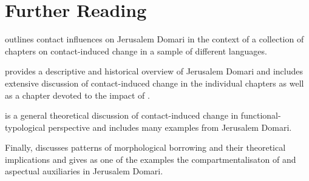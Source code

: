 \documentclass[output=paper]{langsci/langscibook}
\begin{document}
\section*{Further Reading}
\begin{furtherreading}
\item[\citet{Matras2007Domari}] outlines contact influences on Jerusalem Domari in the context of a collection of chapters on contact-induced change in a sample of different languages. 
\item[\citet{Matras2012}] provides a descriptive and historical overview of Jerusalem Domari and includes extensive discussion of contact-induced change in the individual chapters as well as a chapter devoted to the impact of . 
\item[\citet{Matras2009}] is a general theoretical discussion of contact-induced change in functional-typological perspective and includes many examples from Jerusalem Domari. 
\item[Finally, \citet{Matras2015}] discusses patterns of morphological borrowing and their theoretical implications and gives as one of the examples the compartmentalisaton of  and aspectual auxiliaries in Jerusalem Domari. 
\end{furtherreading}
\end{document}
